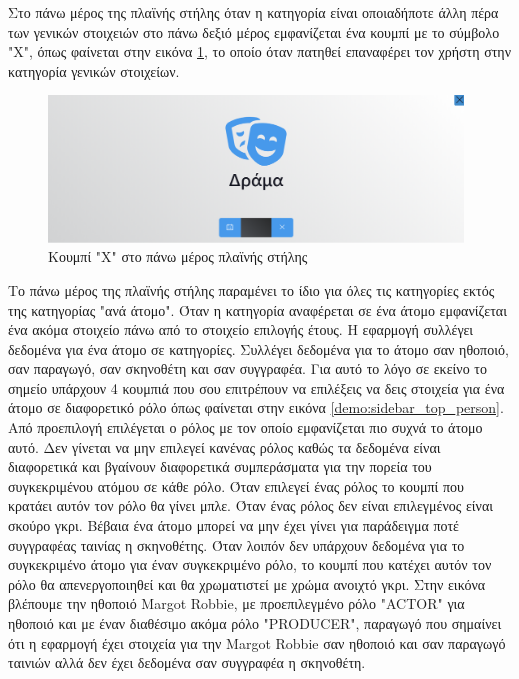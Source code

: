 Στο πάνω μέρος της πλαϊνής στήλης όταν η κατηγορία είναι οποιαδήποτε άλλη πέρα των γενικών στοιχειών στο πάνω δεξιό μέρος εμφανίζεται ένα κουμπί με το σύμβολο "X", όπως φαίνεται στην εικόνα \ref{demo:sidebar_top_x}, το οποίο όταν πατηθεί επαναφέρει τον χρήστη στην κατηγορία γενικών στοιχείων. 

\begin{figure}[h]
  \centering
  \includegraphics[width=110mm]{Chapters/6 - Manual/Images/main_page_sidebar_top_x.png}
  \caption{Κουμπί "Χ" στο πάνω μέρος πλαϊνής στήλης}
  \label{demo:sidebar_top_x}
\end{figure}

Το πάνω μέρος της πλαϊνής στήλης παραμένει το ίδιο για όλες τις κατηγορίες εκτός της κατηγορίας "ανά άτομο". Όταν η κατηγορία αναφέρεται σε ένα άτομο εμφανίζεται ένα ακόμα στοιχείο πάνω από το στοιχείο επιλογής έτους. Η εφαρμογή συλλέγει δεδομένα για ένα άτομο σε κατηγορίες. Συλλέγει δεδομένα για το άτομο σαν ηθοποιό, σαν παραγωγό, σαν σκηνοθέτη και σαν συγγραφέα. Για αυτό το λόγο σε εκείνο το σημείο υπάρχουν 4 κουμπιά που σου επιτρέπουν να επιλέξεις να δεις στοιχεία για ένα άτομο σε διαφορετικό ρόλο όπως φαίνεται στην εικόνα \ref{demo:sidebar_top_person}. Από προεπιλογή επιλέγεται ο ρόλος με τον οποίο εμφανίζεται πιο συχνά το άτομο αυτό. Δεν γίνεται να μην επιλεγεί κανένας ρόλος καθώς τα δεδομένα είναι διαφορετικά και βγαίνουν διαφορετικά συμπεράσματα για την πορεία του συγκεκριμένου ατόμου σε κάθε ρόλο. Όταν επιλεγεί ένας ρόλος το κουμπί που κρατάει αυτόν τον ρόλο θα γίνει μπλε. Όταν ένας ρόλος δεν είναι επιλεγμένος είναι σκούρο γκρι. Βέβαια ένα άτομο μπορεί να μην έχει γίνει για παράδειγμα ποτέ συγγραφέας ταινίας η σκηνοθέτης. Όταν λοιπόν δεν υπάρχουν δεδομένα για το συγκεκριμένο άτομο για έναν συγκεκριμένο ρόλο, το κουμπί που κατέχει αυτόν τον ρόλο θα απενεργοποιηθεί και θα χρωματιστεί με χρώμα ανοιχτό γκρι. Στην εικόνα βλέπουμε την ηθοποιό Margot Robbie, με προεπιλεγμένο ρόλο "ACTOR" για ηθοποιό και με έναν διαθέσιμο ακόμα ρόλο "PRODUCER", παραγωγό που σημαίνει ότι η εφαρμογή έχει στοιχεία για την Margot Robbie σαν ηθοποιό και σαν παραγωγό ταινιών αλλά δεν έχει δεδομένα σαν συγγραφέα η σκηνοθέτη. 

